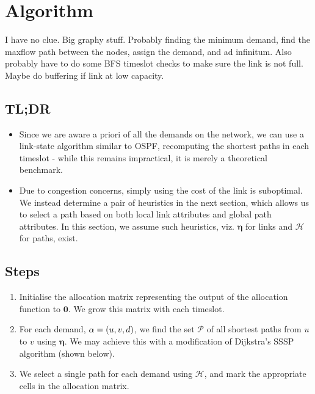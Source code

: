\documentclass{amsart}
\begin{document}
    \section{Algorithm}

    I have no clue. Big graphy stuff. Probably finding the minimum demand, find the maxflow path between the nodes, assign the demand, and ad infinitum. Also probably have to do some BFS timeslot checks to make sure the link is not full. Maybe do buffering if link at low capacity.


    \subsection{TL;DR}
    \begin{itemize}
        \item Since we are aware a priori of all the demands on the network, we can use a link-state algorithm similar to OSPF, recomputing the shortest paths in each timeslot - while this remains impractical, it is merely a theoretical benchmark.
        \item Due to congestion concerns, simply using the cost of the link is suboptimal. We instead determine a pair of heuristics in the next section, which allows us to select a path based on both local link attributes and global path attributes. In this section, we assume such heuristics, viz. \(\boldsymbol{\eta}\) for links and \(\mathcal{H}\) for paths, exist.
    \end{itemize}

    \subsection{Steps}

    \begin{enumerate}
        \item Initialise the allocation matrix representing the output of the allocation function to \(\boldsymbol{0}\). We grow this matrix with each timeslot.
        \item For each demand, \(\alpha = \left(u, v, d\right)\), we find the set \(\mathcal{P}\) of all shortest paths from \(u\) to \(v\) using \(\boldsymbol{\eta}\). We may achieve this with a modification of Dijkstra's SSSP algorithm (shown below). 
        
        \item We select a single path for each demand using \(\mathcal{H}\), and mark the appropriate cells in the allocation matrix.
    \end{enumerate}
\end{document}
